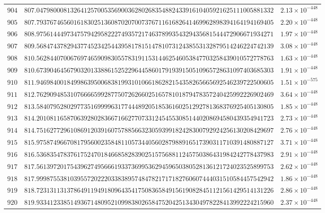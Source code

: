\documentclass[12pt,reqno]{amsart}
\theoremstyle{remark}
\begin{document}
\begin{longtable}{clc}
$904$ & $807.0479800081326412570053569003628026835488243391610405921625111005881332$ & $2.13\times 10^{-448}$ \\
$905$ & $807.7937674656016183025136087020700737671161682641469962898394164194169405$ & $2.20\times 10^{-448}$ \\
$906$ & $808.9756144497347579429582227493572174637899354329435681544472906671934271$ & $1.97\times 10^{-448}$ \\
$907$ & $809.5684743782943774523425443958178151478107312438553132879514246224742139$ & $3.08\times 10^{-448}$ \\
$908$ & $810.5628440700676974659098305578319115314462546053847703258439010572778763$ & $1.63\times 10^{-448}$ \\
$909$ & $810.6739046456790320133886152522964458601791939150510965728631097403685303$ & $1.91\times 10^{-448}$ \\
$910$ & $811.9469840018499863950068381993101066186282154358265665692546239722500605$ & $1.51\times 10^{-575}$ \\
$911$ & $812.7629094853107666659928775072626602516578101879478357240425992226902469$ & $3.64\times 10^{-448}$ \\
$912$ & $813.5840795280297735169999631774448920518536160251292781368376925405130805$ & $1.85\times 10^{-448}$ \\
$913$ & $814.2010811658706392802836671662770733124545530851440208694580439354941723$ & $2.73\times 10^{-448}$ \\
$914$ & $814.7516277296108691203916075788566323059399182428300792924256130208429697$ & $2.76\times 10^{-448}$ \\
$915$ & $815.9758749667081795600235848110573440560287988916517390311710391480887127$ & $3.71\times 10^{-448}$ \\
$916$ & $816.5368354783761752470184668582839025157568811245750386431984242778437983$ & $2.91\times 10^{-448}$ \\
$917$ & $817.5613972017543962749566619337369953629459650380528136121724023525899753$ & $2.62\times 10^{-448}$ \\
$918$ & $817.9998755381039557202220338389574847821717182760607444031510584457542942$ & $1.86\times 10^{-448}$ \\
$919$ & $818.7231311313786491194918096435417508365849156190828451121561429514131226$ & $2.86\times 10^{-448}$ \\
$920$ & $819.9334123385149367148095210998380265847520425134304978228413992224215960$ & $2.37\times 10^{-448}$ \\

\end{longtable}
\end{document}

